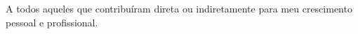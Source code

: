 \begin{dedicatoria}
A todos aqueles que contribuíram direta ou indiretamente para meu crescimento pessoal e profissional.
\end{dedicatoria}